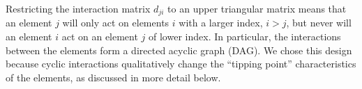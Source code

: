 \documentclass[conference]{IEEEtran}
\newcommand{\vectorsym}[1]{\ensuremath{\mathbf{#1}}}
\newcommand{\agentimpact}{\ensuremath{e}}
\newcommand{\couplingconstant}{\ensuremath{d}}
\begin{document}
Restricting the interaction matrix $\couplingconstant_{ji}$ to an upper triangular
matrix means that an element $j$ will only act on elements $i$ with a
larger index, $i>j$, but
never will an element $i$ act on an element $j$ of lower index. In
particular,  the interactions between the elements form a
directed acyclic graph (DAG). %
We chose this design because cyclic interactions qualitatively change
the ``tipping point'' characteristics of the elements, as discussed in
more detail below.




\end{document}
